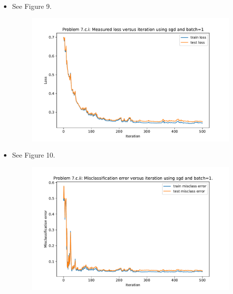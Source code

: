 \begin{itemize}
    \item See Figure 9. 
    \begin{figure}[h!]
	\centering
        \includegraphics[width=0.5\linewidth]{images/P7_c_i.pdf}
        \caption{}
    \end{figure}
    \item See Figure 10. 
    \begin{figure}[h!]
	\centering
        \includegraphics[width=0.5\linewidth]{images/P7_c_ii.pdf}
        \caption{}
    \end{figure}
\end{itemize}
